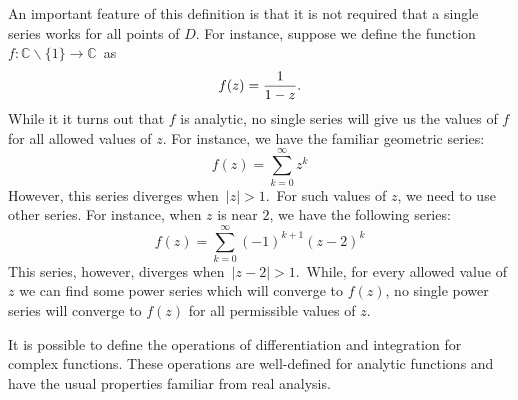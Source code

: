 \documentclass[12pt]{article}
\theoremstyle{definition}
\begin{document}
An important feature of this definition is that it 
is not required that a single series works for
all points of $D$.  For instance, suppose
we define the function\, $f \colon \mathbb{C}\!\smallsetminus\!\{1\} \to \mathbb{C}$\, as 
\[
f(z) = {1 \over 1 - z}.
\]
While it it turns out that $f$ is analytic, no single
series will give us the values of $f$ for all allowed
values of $z$.  For instance, we have the familiar
geometric series:
\[
f(z) = \sum_{k=0}^\infty z^k
\]
However, this series diverges when\, $|z| > 1$.\,  For
such values of $z$, we need to use other series.
For instance, when $z$ is near $2$, we have the
following series:
\[
f(z) = \sum_{k=0}^\infty (-1)^{k+1} (z-2)^k
\]
This series, however, diverges when\, $|z-2| > 1$.\,
While, for every allowed value of $z$ we can find
some power series which will converge to $f(z)$, no
single power series will converge to $f(z)$ for 
all permissible values of $z$.

It is possible to define the operations of
differentiation and integration for complex
functions.  These operations are well-defined
for analytic functions and have the usual
properties familiar from real analysis.
\end{document}
